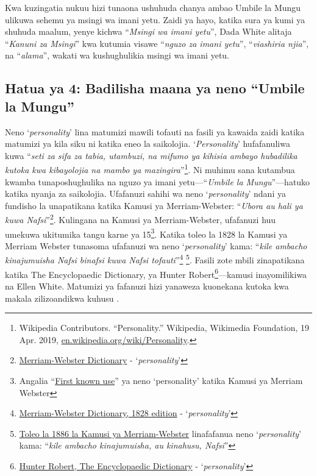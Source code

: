 Kwa kuzingatia nukuu hizi tunaona ushuhuda chanya ambao Umbile la Mungu ulikuwa sehemu ya msingi wa imani yetu. Zaidi ya hayo, katika sura ya kumi ya shuhuda maalum, yenye kichwa “\textit{Msingi wa imani yetu}”, Dada White alitaja “\textit{Kanuni za Msingi}” kwa kutumia visawe “\textit{nguzo za imani yetu}”, “\textit{viashiria njia}”, na “\textit{alama}”, wakati wa kushughulikia msingi wa imani yetu.

\subsection*{Hatua ya 4: Badilisha maana ya neno “Umbile la Mungu”}

Neno ‘\textit{personality}’ lina matumizi mawili tofauti na fasili ya kawaida zaidi katika matumizi ya kila siku ni katika eneo la saikolojia. ‘\textit{Personality}’ hufafanuliwa kuwa “\textit{seti za sifa za tabia, utambuzi, na mifumo ya kihisia ambayo hubadilika kutoka kwa kibayolojia na mambo ya mazingira}”\footnote{Wikipedia Contributors. “Personality.” Wikipedia, Wikimedia Foundation, 19 Apr. 2019, \href{https://en.wikipedia.org/wiki/Personality}{en.wikipedia.org/wiki/Personality}.}. Ni muhimu sana kutambua kwamba tunaposhughulika na nguzo ya imani yetu—“\textit{Umbile la Mungu}”—hatuko katika nyanja za saikolojia. Ufafanuzi sahihi wa neno ‘\textit{personality}’ ndani ya fundisho la  unapatikana katika Kamusi ya Merriam-Webster: “\textit{Ubora au hali ya kuwa Nafsi}”\footnote{\href{https://www.merriam-webster.com/dictionary/personality}{Merriam-Webster Dictionary} - ‘\textit{personality}’}. Kulingana na Kamusi ya Merriam-Webster, ufafanuzi huu umekuwa ukitumika tangu karne ya 15\footnote{Angalia “\href{https://www.merriam-webster.com/dictionary/personality\#word-history}{First known use}” ya neno ‘personality’ katika Kamusi ya Merriam Webster}. Katika toleo la 1828 la Kamusi ya Merriam Webster tunasoma ufafanuzi wa neno ‘\textit{personality}’ kama: “\textit{kile ambacho kinajumuisha Nafsi binafsi kuwa Nafsi tofauti}”\footnote{\href{https://archive.org/details/americandictiona02websrich/page/272/mode/2up}{Merriam-Webster Dictionary, 1828 edition} - ‘\textit{personality}’} \footnote{\href{https://archive.org/details/websterscomplete00webs/page/974/mode/2up}{Toleo la 1886 la Kamusi ya Merriam-Webster} linafafanua neno ‘\textit{personality}’ kama: “\textit{kile ambacho kinajumuisha, au kinahusu, Nafsi}”}. Fasili zote mbili zinapatikana katika The Encyclopaedic Dictionary, ya Hunter Robert\footnote{\href{https://babel.hathitrust.org/cgi/pt?id=mdp.39015050663213&view=1up&seq=780}{Hunter Robert, The Encyclopaedic Dictionary} - ‘\textit{personality}’}—kamusi inayomilikiwa na Ellen White. Matumizi ya fafanuzi hizi yanaweza kuonekana kutoka kwa makala zilizoandikwa kuhusu .

